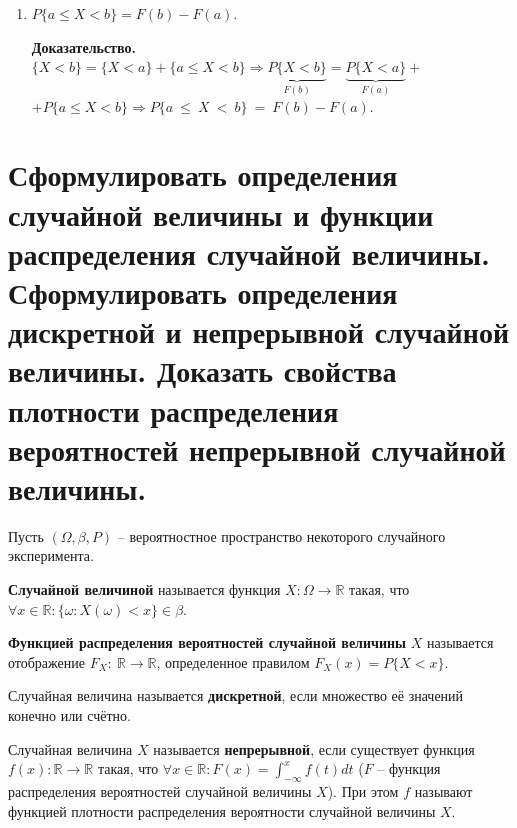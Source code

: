 \begin{enumerate}
	\item $P\{a \leq X < b\} = F(b) - F(a)$.
	
		\textbf{Доказательство.} $\{X < b\} = \{X < a\} + \{a \leq X < b\} \Rightarrow \underbrace{P\{X < b\}}_\text{$F(b)$} = \underbrace{P\{X < a\}}_\text{$F(a)$} +$\newline $+P\{a \leq X < b\} \Rightarrow P\{a~\leq~X~<~b\}~=~F(b) - F(a)$.
\end{enumerate}

\section{Сформулировать определения случайной величины и функции распределения случайной величины. Сформулировать определения дискретной и непрерывной случайной величины. Доказать свойства плотности распределения вероятностей непрерывной случайной величины.}

Пусть $(\Omega, \beta, P)$ -- вероятностное пространство некоторого случайного эксперимента.

\textbf{Случайной величиной} называется функция $X: \Omega \rightarrow \mathbb{R}$ такая, что $\forall x \in \mathbb{R}: \{\omega: X(\omega) < x\} \in \beta$.

\textbf{Функцией распределения вероятностей случайной величины} $X$ называется отображение $F_X:~\mathbb{R}\rightarrow\mathbb{R}$, определенное правилом $F_X(x) = P\{X < x\}$.

Случайная величина называется \textbf{дискретной}, если множество её значений конечно или счётно.

Случайная величина $X$ называется \textbf{непрерывной}, если существует функция $f(x): \mathbb{R} \rightarrow \mathbb{R}$ такая, что $\forall x \in \mathbb{R}: F(x) = \int_{-\infty}^{x}f(t)dt$ ($F$ -- функция распределения вероятностей случайной величины $X$). При этом $f$ называют функцией плотности распределения вероятности случайной величины $X$.

